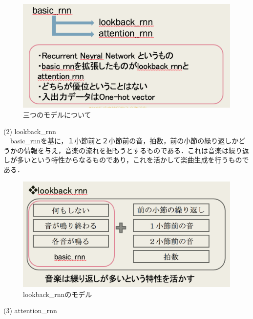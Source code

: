 \begin{figure}[!ht]
    \begin{screen}
    \begin{center}
        \includegraphics[scale=0.8,clip]{./img/basic1.png}
        \caption{三つのモデルについて}
        \label{fig:Melody_RNNについて}
    \end{center}
    \end{screen}
\end{figure}
\newpage
(2) lookback\_rnn\\
　basic\_rnnを基に，１小節前と２小節前の音，拍数，前の小節の繰り返しかどうかの情報を与え，音楽の流れを掴もうとするものである．これは音楽は繰り返しが多いという特性からなるものであり，これを活かして楽曲生成を行うものである．
\begin{figure}[!ht]
    \begin{screen}
    \begin{center}
        \includegraphics[scale=0.8,clip]{./img/lookback1.png}
        \caption{lookback\_rnnのモデル}
        \label{fig:lookback_rnnのモデル}
    \end{center}
    \end{screen}
\end{figure}
\newpage
(3) attention\_rnn\\
